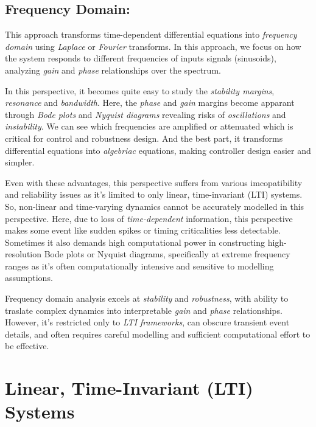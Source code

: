 \documentclass{report}
\begin{document}
\section{Frequency Domain:}
This approach transforms time-dependent differential equations into \textit{frequency domain} using \textit{Laplace} or \textit{Fourier} transforms. In this approach, we focus on how the system responds to different frequencies of inputs
signals (sinusoids), analyzing \textit{gain} and \textit{phase} relationships over the spectrum.
\\
\par
In this perspective, it becomes quite easy to study the \textit{stability margins}, \textit{resonance} and \textit{bandwidth}. Here, the \textit{phase} and \textit{gain} margins become apparant through
\textit{Bode plots} and \textit{Nyquist diagrams} revealing risks of \textit{oscillations} and \textit{instability}. We can see which frequencies are amplified or attenuated which is critical for control and
robustness design. And the best part, it transforms differential equations into \textit{algebriac} equations, making controller design easier and simpler.
\\
\par
Even with these advantages, this perspective suffers from various imcopatibility and reliability issues as it's limited to only linear, time-invariant (LTI) systems. So, non-linear and time-varying dynamics cannot be accurately modelled in this
perspective. Here, due to loss of \textit{time-dependent} information, this perspective makes some event like sudden spikes or timing criticalities less detectable. Sometimes it also demands high computational power in constructing high-resolution
Bode plots or Nyquist diagrams, specifically at extreme frequency ranges as it's often computationally intensive and sensitive to modelling assumptions.
\\
\par
Frequency domain analysis excels at \textit{stability} and \textit{robustness}, with ability to traslate complex dynamics into interpretable \textit{gain} and \textit{phase} relationships. However, it's restricted only to \textit{LTI frameworks},
can obscure transient event details, and often requires careful modelling and sufficient computational effort to be effective.

\chapter{Linear, Time-Invariant (LTI) Systems}
\end{document}
